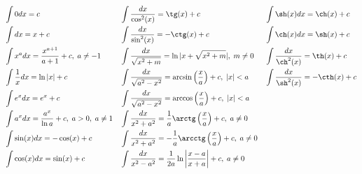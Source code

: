 \documentclass{article}
\begin{document}
\begin{align*}
	 & \int 0dx=c                                         &  & \int\frac{dx}{\cos^{2}(x)}=\tg(x)+c                                                &  & \int\sh(x)dx=\ch(x)+c                \\
	 & \int dx=x+c                                        &  & \int\frac{dx}{\sin^{2}(x)}=-\ctg(x)+c                                              &  & \int\ch(x)dx=\sh(x)+c                \\
	 & \int x^{a}dx=\frac{x^{a+1}}{a+1}+c,\;a\neq -1      &  & \int\frac{dx}{\sqrt{x^{2}+m}}=\ln|x+\sqrt{x^{2}+m}|,\;m\neq 0                      &  & \int\frac{dx}{\ch^{2}(x)}=\th(x)+c   \\
	 & \int \frac{1}{x}dx=\ln|x|+c                        &  & \int\frac{dx}{\sqrt{a^{2}-x^{2}}}=\arcsin\left(\frac{x}{a}\right)+c,\;|x|<a        &  & \int\frac{dx}{\sh^{2}(x)}=-\cth(x)+c \\
	 & \int e^{x}dx=e^{x}+c                               &  & \int\frac{dx}{\sqrt{a^{2}-x^{2}}}=\arccos\left(\frac{x}{a}\right)+c,\;|x|<a                                                  \\
	 & \int a^{x}dx=\frac{a^{x}}{\ln a}+c,\;a>0,\;a\neq 1 &  & \int\frac{dx}{x^{2}+a^{2}}=\frac{1}{a}\arctg\left(\frac{x}{a}\right)+c,\;a\neq 0                                             \\
	 & \int \sin(x)dx=-\cos(x)+c                          &  & \int\frac{dx}{x^{2}+a^{2}}=-\frac{1}{a}\arcctg\left(\frac{x}{a}\right)+c,\;a\neq 0                                           \\
	 & \int \cos(x)dx=\sin(x)+c                           &  & \int\frac{dx}{x^{2}-a^{2}}=\frac{1}{2a}\ln\left|\frac{x-a}{x+a}\right|+c,\;a\neq 0
\end{align*}
\end{document}
